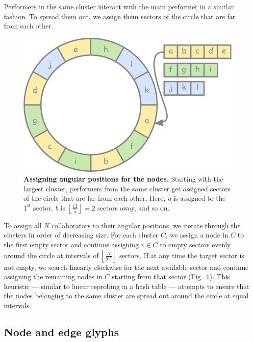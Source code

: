 \documentclass[12pt]{cmuthesis}
\begin{document}
  Performers in the same cluster interact with the main performer in a similar fashion. To spread them out, we assign them sectors of the circle that are far from each other.
  \begin{figure}[ht]
    \centering
    \includegraphics[width=0.6\linewidth]{figures/ordering}
    \caption{\textbf{Assigning angular positions for the nodes.} Starting with the largest cluster, performers from the same cluster get assigned sectors of the circle that are far from each other. Here, \emph{a} is assigned to the $1^\textrm{st}$ sector, \emph{b} is $\left\lfloor \frac{12}{5} \right\rfloor = 2$ sectors away, and so on.}
    \label{fig:moj:ordering}
  \end{figure}
  To assign all $N$ collaborators to their angular positions, we iterate through the clusters in order of decreasing size.  For each cluster $C$, we assign a node in $C$ to the first empty sector and continue assigning $v \in C$ to empty sectors evenly around the circle at intervals of $\left\lfloor\frac{N}{|C|}\right\rfloor$ sectors.  If at any time the target sector is not empty, we search linearly clockwise for the next available sector and continue assigning the remaining nodes in $C$ starting from that sector (Fig.~\ref{fig:moj:ordering}). This heuristic --- similar to linear reprobing in a hash table --- attempts to ensure that the nodes belonging to the same cluster are spread out around the circle at equal intervals.


  \subsection{Node and edge glyphs}
\end{document}
